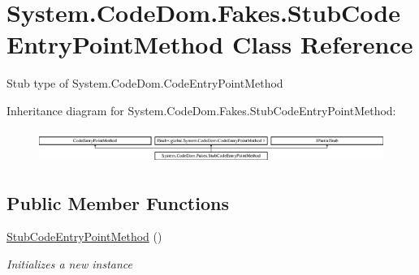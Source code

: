 \hypertarget{class_system_1_1_code_dom_1_1_fakes_1_1_stub_code_entry_point_method}{\section{System.\-Code\-Dom.\-Fakes.\-Stub\-Code\-Entry\-Point\-Method Class Reference}
\label{class_system_1_1_code_dom_1_1_fakes_1_1_stub_code_entry_point_method}
}


Stub type of System.\-Code\-Dom.\-Code\-Entry\-Point\-Method 


Inheritance diagram for System.\-Code\-Dom.\-Fakes.\-Stub\-Code\-Entry\-Point\-Method\-:\begin{figure}[H]
\begin{center}
\leavevmode
\includegraphics[height=1.088435cm]{class_system_1_1_code_dom_1_1_fakes_1_1_stub_code_entry_point_method}
\end{center}
\end{figure}
\subsection*{Public Member Functions}
\begin{DoxyCompactItemize}
\item 
\hyperlink{class_system_1_1_code_dom_1_1_fakes_1_1_stub_code_entry_point_method_ac9c356034f856ddb04c72522fcc4c8d8}{Stub\-Code\-Entry\-Point\-Method} ()
\begin{DoxyCompactList}\small\item\em Initializes a new instance\end{DoxyCompactList}\end{DoxyCompactItemize}

